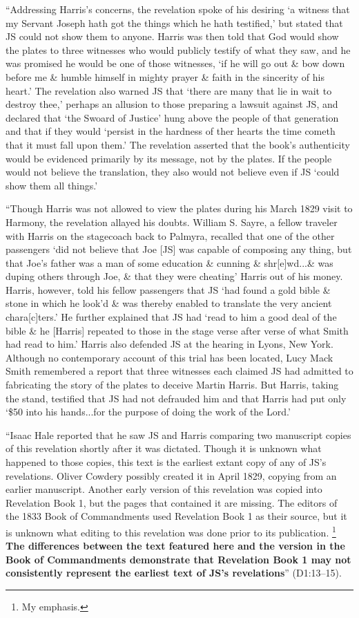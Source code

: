 			``Addressing Harris's concerns, the revelation spoke of his desiring `a witness that my Servant Joseph hath got the things which he hath testified,' but stated that JS could not show them to anyone. Harris was then told that God would show the plates to three witnesses who would publicly testify of what they saw, and he was promised he would be one of those witnesses, `if he will go out \& bow down before me \& humble himself in mighty prayer \& faith in the sincerity of his heart.' The revelation also warned JS that `there are many that lie in wait to destroy thee,' perhaps an allusion to those preparing a lawsuit against JS, and declared that `the Swoard of Justice' hung above the people of that generation and that if they would `persist in the hardness of ther hearts the time cometh that it must fall upon them.' The revelation asserted that the book's authenticity would be evidenced primarily by its message, not by the plates. If the people would not believe the translation, they also would not believe even if JS `could show them all things.'
			
			``Though Harris was not allowed to view the plates during his March 1829 visit to Harmony, the revelation allayed his doubts. William S. Sayre, a fellow traveler with Harris on the stagecoach back to Palmyra, recalled that one of the other passengers `did not believe that Joe [JS] was capable of composing any thing, but that Joe's father was a man of some education \& cunning \& shr[e]wd...\& was duping others through Joe, \& that they were cheating' Harris out of his money. Harris, however, told his fellow passengers that JS `had found a gold bible \& stone in which he look'd \& was thereby enabled to translate the very ancient chara[c]ters.' He further explained that JS had `read to him a good deal of the bible \& he [Harris] repeated to those in the stage verse after verse of what Smith had read to him.' Harris also defended JS at the hearing in Lyons, New York. Although no contemporary account of this trial has been located, Lucy Mack Smith remembered a report that three witnesses each claimed JS had admitted to fabricating the story of the plates to deceive Martin Harris. But Harris, taking the stand, testified that JS had not defrauded him and that Harris had put only `\$50 into his hands...for the purpose of doing the work of the Lord.'
			
			``Isaac Hale reported that he saw JS and Harris comparing two manuscript copies of this revelation shortly after it was dictated. Though it is unknown what happened to those copies, this text is the earliest extant copy of any of JS's revelations. Oliver Cowdery possibly created it in April 1829, copying from an earlier manuscript. Another early version of this revelation was copied into Revelation Book 1, but the pages that contained it are missing. The editors of the 1833 Book of Commandments used Revelation Book 1 as their source, but it is unknown what editing to this revelation was done prior to its publication.
				\footnote{%
					My emphasis.
					}%
			\textbf{The differences between the text featured here and the version in the Book of Commandments demonstrate that Revelation Book 1 may not consistently represent the earliest text of JS's revelations}'' (D1:13--15).
		
